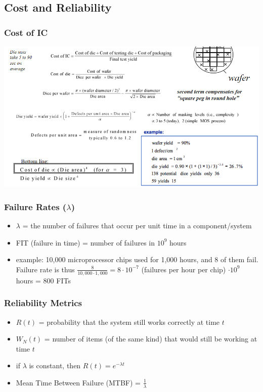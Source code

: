 \documentclass[12pt]{extarticle}
\begin{document}
	\subsection{Cost and Reliability}

	\subsubsection{Cost of IC}

	\begin{center}
		\includegraphics[scale=0.7]{assets/cost-of-ic.png}
	\end{center}

	\subsubsection{Failure Rates ($\lambda$)}

	\begin{itemize}
		\item $\lambda$ = the number of failures that occur per unit time in a component/system
		\item FIT (failure in time) = number of failures in $10^9$ hours
		\item example: 10,000 microprocessor chips used for 1,000 hours, and 8 of them fail. Failure rate is thus 
		$\frac{8}{10,000 \cdot 1,000} = 8 \cdot 10^{-7}$ (failures per hour per chip) $\cdot 10^9$ hours = 800 FITs
	\end{itemize}

	\subsubsection{Reliability Metrics}

	\begin{itemize}
		\item $R(t)$ = probability that the system still works correctly at time $t$
		\item $W_N(t)$ = number of items (of the same kind) that would still be working at time $t$
		\item if $\lambda$ is constant, then $R(t) = e^{-\lambda t}$
		\item Mean Time Between Failure (MTBF) = $\frac{1}{\lambda}$
	\end{itemize}
\end{document}
